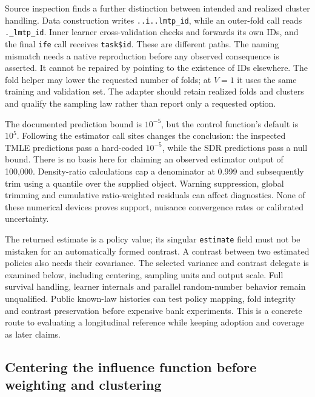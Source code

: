 Source inspection finds a further distinction between intended and realized
cluster handling. Data construction writes \texttt{..i..lmtp\_id}, while an
outer-fold call reads \texttt{.\_lmtp\_id}. Inner learner cross-validation
checks and forwards its own IDs, and the final \texttt{ife} call receives
\texttt{task\$id}. These are different paths. The naming mismatch needs a
native reproduction before any observed consequence is asserted. It cannot
be repaired by pointing to the existence of IDs elsewhere. The fold helper
may lower the requested number of folds; at $V=1$ it uses the same training
and validation set. The adapter should retain realized folds and clusters
and qualify the sampling law rather than report only a requested option.

The documented prediction bound is $10^{-5}$, but the control function's
default is $10^5$. Following the estimator call sites changes the conclusion:
the inspected TMLE predictions pass a hard-coded $10^{-5}$, while the SDR
predictions pass a null bound. There is no basis here for claiming an observed
estimator output of 100,000. Density-ratio calculations cap a denominator at
0.999 and subsequently trim using a quantile over the supplied object.
Warning suppression, global trimming and cumulative ratio-weighted residuals
can affect diagnostics. None of these numerical devices proves support,
nuisance convergence rates or calibrated uncertainty.
\citep{exec22_lmtp_reuse}

The returned estimate is a policy value; its singular \texttt{estimate} field
must not be mistaken for an automatically formed contrast. A contrast between
two estimated policies also needs their covariance. The selected variance
and contrast delegate is examined below, including centering, sampling units
and output scale. Full survival handling, learner internals and parallel
random-number behavior remain unqualified. Public known-law
histories can test policy mapping, fold integrity and contrast preservation
before expensive bank experiments. This is a concrete route to evaluating a
longitudinal reference while keeping adoption and coverage as later claims.

\subsection{Centering the influence function before weighting and clustering}
\label{rel23:ife-centering}

